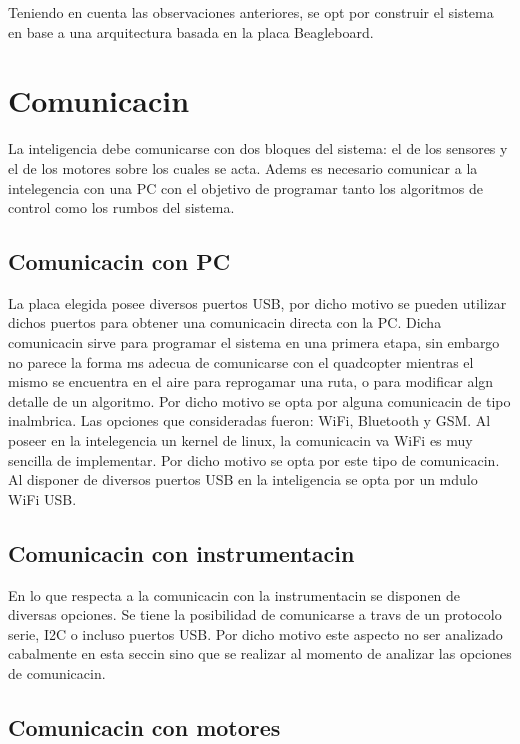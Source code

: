 \documentclass[spanish,12pt,a4paper,titlepage]{report}
\begin{document}
Teniendo en cuenta las observaciones anteriores, se opt por construir el sistema en base a una arquitectura basada en la placa Beagleboard.

\section{Comunicacin}
\vspace*{15pt}

La inteligencia debe comunicarse con dos bloques del sistema: el de los sensores y el de los motores sobre los cuales se acta. Adems es necesario comunicar a la intelegencia con una PC con el objetivo de programar tanto los algoritmos de control como los rumbos del sistema. 
 
\subsection{Comunicacin con PC}
\vspace*{15pt}
La placa elegida posee diversos puertos USB, por dicho motivo se pueden utilizar dichos puertos para obtener una comunicacin directa con la PC. Dicha comunicacin sirve para programar el sistema en una primera etapa, sin embargo no parece la forma ms adecua de comunicarse con el quadcopter mientras el mismo se encuentra en el aire para reprogamar una ruta, o para modificar algn detalle de un algoritmo. Por dicho motivo se opta por alguna comunicacin de tipo inalmbrica. Las opciones que consideradas fueron: WiFi, Bluetooth y GSM. Al poseer en la intelegencia un kernel de linux, la comunicacin va WiFi es muy sencilla de implementar. Por dicho motivo se opta por este tipo de comunicacin. Al disponer de diversos puertos USB en la inteligencia se opta por un mdulo WiFi USB.    


\subsection{Comunicacin con instrumentacin}
\vspace*{15pt}

En lo que respecta a la comunicacin con la instrumentacin se disponen de diversas opciones. Se tiene la posibilidad de comunicarse a travs de un protocolo serie, I2C o incluso puertos USB. Por dicho motivo este aspecto no ser analizado cabalmente en esta seccin sino que se realizar al momento de analizar las opciones de comunicacin.  

\subsection{Comunicacin con motores}
\vspace*{15pt}
\end{document}
